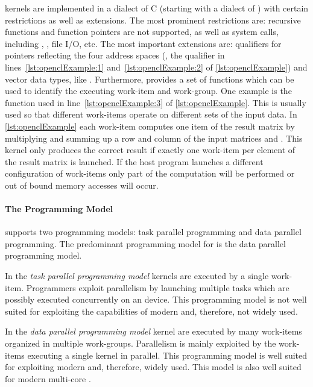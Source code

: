 \OpenCL kernels are implemented in a dialect of C (starting with  a dialect of \Cpp) with certain restrictions as well as extensions.
The most prominent restrictions are:
recursive functions and function pointers are not supported, as well as system calls, including , , file I/O, etc.
The most important extensions are:
qualifiers for pointers reflecting the four address spaces (\eg, the  qualifier in lines~\ref{lst:openclExample:1} and~\ref{lst:openclExample:2} of \autoref{lst:openclExample}) and vector data types, like .
Furthermore, \OpenCL provides a set of functions which can be used to identify the executing work-item and work-group.
One example is the  function used in line~\ref{lst:openclExample:3} of \autoref{lst:openclExample}.
This is usually used so that different work-items operate on different sets of the input data.
In \autoref{lst:openclExample} each work-item computes one item of the result matrix  by multiplying and summing up a row and column of the input matrices  and .
This kernel only produces the correct result if exactly one work-item per element of the result matrix is launched.
If the host program launches a different configuration of work-items only part of the computation will be performed or out of bound memory accesses will occur.

\paragraph{The \OpenCL Programming Model}

\OpenCL supports two programming models: task parallel programming and data parallel programming.
The predominant programming model for \OpenCL is the data parallel programming model.

In the \emph{task parallel programming model} kernels are executed by a single work-item.
Programmers exploit parallelism by launching multiple tasks which are possibly executed concurrently on an \OpenCL device.
This programming model is not well suited for exploiting the capabilities of modern \GPUs and, therefore, not widely used.

In the \emph{data parallel programming model} kernel are executed by many work-items organized in multiple work-groups.
Parallelism is mainly exploited by the work-items executing a single kernel in parallel.
This programming model is well suited for exploiting modern \GPUs and, therefore, widely used.
This model is also well suited for modern multi-core \CPUs.

